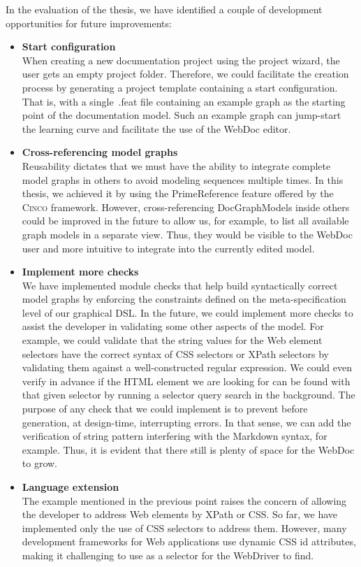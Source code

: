 In the evaluation of the thesis, we have identified a couple of development opportunities for future improvements:
\begin{itemize}
    \item \textbf{Start configuration}\\
        When creating a new documentation project using the project wizard, the user gets an empty project folder. Therefore, we could facilitate the creation process by generating a project template containing a start configuration. That is, with a single~.feat file containing an example graph as the starting point of the documentation model. Such an example graph can jump-start the learning curve and facilitate the use of the WebDoc editor.
    \item \textbf{Cross-referencing model graphs}\\
        Reusability dictates that we must have the ability to integrate complete model graphs in others to avoid modeling sequences multiple times. In this thesis, we achieved it by using the PrimeReference feature offered by the \textsc{Cinco} framework. However, cross-referencing DocGraphModels inside others could be improved in the future to allow us, for example, to list all available graph models in a separate view. Thus, they would be visible to the WebDoc user and more intuitive to integrate into the currently edited model.
    \item \textbf{Implement more checks}\\
        We have implemented module checks that help build syntactically correct model graphs by enforcing the constraints defined on the meta-specification level of our graphical DSL. In the future, we could implement more checks to assist the developer in validating some other aspects of the model. For example, we could validate that the string values for the Web element selectors have the correct syntax of CSS selectors or XPath selectors by validating them against a well-constructed regular expression. We could even verify in advance if the HTML element we are looking for can be found with that given selector by running a selector query search in the background. The purpose of any check that we could implement is to prevent before generation, at design-time, interrupting errors. In that sense, we can add the verification of string pattern interfering with the Markdown syntax, for example. Thus, it is evident that there still is plenty of space for the WebDoc to grow.
    \item \textbf{Language extension}\\
        The example mentioned in the previous point raises the concern of allowing the developer to address Web elements by XPath or CSS\@. So far, we have implemented only the use of CSS selectors to address them. However, many development frameworks for Web applications use dynamic CSS id attributes, making it challenging to use as a selector for the WebDriver to find. 


\end{itemize}
